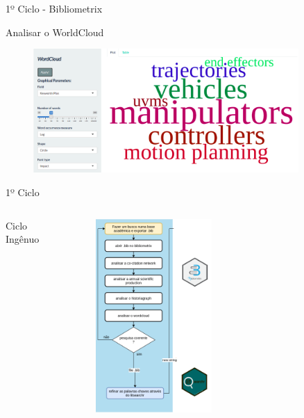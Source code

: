 \begin{frame}{1º Ciclo - Bibliometrix}

	Analisar o WorldCloud
	\begin{figure}[hb]
		\centering
		\includegraphics[width=0.9\textwidth]{figures/bibliometrix/b14.png}
	\end{figure}
	
\end{frame}

\begin{frame}{1º Ciclo}

	\begin{columns}
        Ciclo Ingênuo
		\begin{figure}[hb]
            \includegraphics[width=0.5\textwidth]{figures/ciclo1.png}
		\end{figure}
	\end{columns}
\end{frame}

